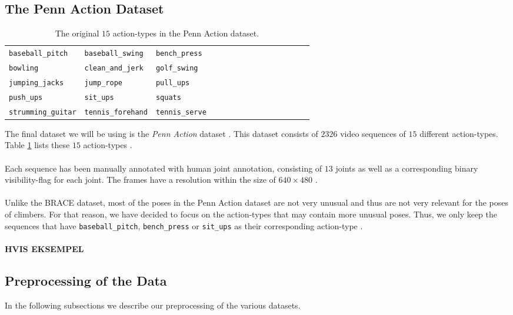 \documentclass[./main.tex]{subfiles}
\begin{document}
\subsection{The Penn Action Dataset}
\begin{table}
    \begin{tabular}[htbp]{lllllllllllllll}
        \texttt{baseball\_pitch} & \texttt{baseball\_swing} & \texttt{bench\_press} \\
        \texttt{bowling} & \texttt{clean\_and\_jerk} & \texttt{golf\_swing} \\
        \texttt{jumping\_jacks} & \texttt{jump\_rope} & \texttt{pull\_ups} \\
        \texttt{push\_ups} & \texttt{sit\_ups} & \texttt{squats} \\
        \texttt{strumming\_guitar} & \texttt{tennis\_forehand} & \texttt{tennis\_serve}
    \end{tabular}
    \caption{The original $15$ action-types in the Penn Action dataset.}
    \label{tab:PA_actions}
\end{table}
The final dataset we will be using is the \textit{Penn Action} dataset \cite{penn_action}. This dataset consists of $2326$ video sequences of $15$ different action-types. Table \ref{tab:PA_actions} lists these $15$ action-types \cite{penn_action}.
\\
\\
Each sequence has been manually annotated with human joint annotation, consisting of $13$ joints as well as a corresponding binary visibility-flag for each joint. The frames have a resolution within the size of $640 \times 480$ \cite{penn_action}.
\\
\\
Unlike the BRACE dataset, most of the poses in the Penn Action dataset are not very unusual and thus are not very relevant for the poses of climbers. For that reason, we have decided to focus on the action-types that may contain more unusual poses. Thus, we only keep the sequences that have \texttt{baseball\_pitch}, \texttt{bench\_press} or \texttt{sit\_ups} as their corresponding action-type \cite{penn_action}.
\\
\\
\textbf{HVIS EKSEMPEL}

\subsection{Preprocessing of the Data}
In the following subsections we describe our preprocessing of the various datasets.
\end{document}
